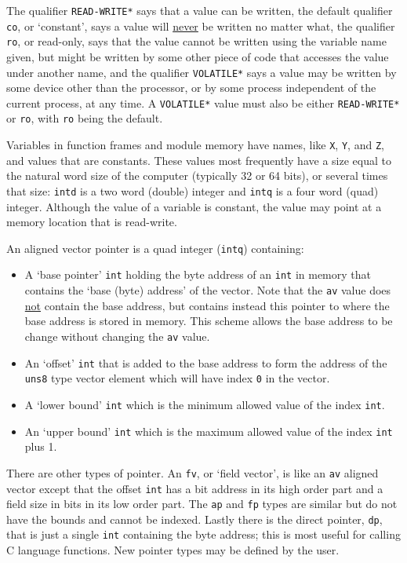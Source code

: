 \documentclass[12pt]{article}
\begin{document}
The qualifier {\tt *READ-WRITE*} says that a value can be written,
the default qualifier {\tt co}, or `constant',
says a value will \underline{never} be written no matter what,
the qualifier {\tt ro}, or read-only, says that
the value cannot be written using the variable name given, but might be
written by some other piece of code that accesses the value under another
name, and the qualifier {\tt *VOLATILE*} says a value may be
written by some device other than the processor, or by some process
independent of the current process, at any time.
A {\tt *VOLATILE*} value must also be either {\tt *READ-WRITE*}
or {\tt ro}, with {\tt ro} being the default.

Variables in function frames and module memory
have names, like {\tt X}, {\tt Y}, and {\tt Z}, and values
that are constants.
These values most frequently
have a size equal to the natural
word size of the computer (typically 32 or 64 bits), or
several times that size: {\tt intd} is a two word (double) integer
and {\tt intq} is a four word (quad) integer.
Although the value of a variable is constant, the value may point
at a memory location that is read-write.

An aligned vector pointer is a
quad integer ({\tt intq}) containing:
\begin{itemize}
\item A `base pointer' {\tt int} holding the byte address
of an {\tt int} in memory
that contains the `base (byte) address' of the vector.
Note that the {\tt av} value does \underline{not} contain
the base address, but contains instead this pointer to where
the base address is stored in memory.  This scheme allows
the base address to be change without changing the {\tt av} value.
\item An `offset' {\tt int} that is added to the base address
to form the address of the {\tt uns8} type vector element
which will have index {\tt 0} in the vector.
\item A `lower bound' {\tt int} which is the minimum allowed
value of the index {\tt int}.
\item An `upper bound' {\tt int} which is the maximum allowed
value of the index {\tt int} plus 1.
\end{itemize}

There are other types of pointer.  An {\tt fv}, or `field vector',
is like an {\tt av} aligned
vector except that the offset {\tt int} has a bit address in its
high order part and a field size in bits in its low order part.
The {\tt ap} and {\tt fp} types are
similar but do not have the bounds and cannot be indexed.  Lastly
there is the direct pointer, {\tt dp}, that is just a single {\tt int}
containing the byte address; this is most useful for calling
C language functions.
New pointer types may be defined by the user.
\end{document}
